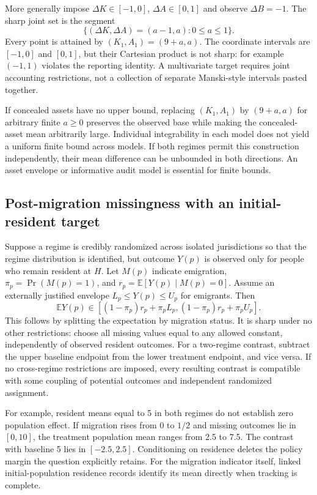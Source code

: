 \documentclass[11pt]{article}
\newcommand{\E}{\mathbb E}
\begin{document}
More generally impose $\Delta K\in[-1,0]$, $\Delta A\in[0,1]$ and observe
$\Delta B=-1$. The sharp joint set is the segment
\[
 \{(\Delta K,\Delta A)=(a-1,a):0\leq a\leq1\}.
\]
Every point is attained by $(K_1,A_1)=(9+a,a)$. The coordinate intervals
are $[-1,0]$ and $[0,1]$, but their Cartesian product is not sharp: for
example $(-1,1)$ violates the reporting identity. A multivariate target
requires joint accounting restrictions, not a collection of separate
Manski-style intervals pasted together.

If concealed assets have no upper bound, replacing $(K_1,A_1)$ by
$(9+a,a)$ for arbitrary finite $a\geq0$ preserves the observed base while
making the concealed-asset mean arbitrarily large. Individual integrability
in each model does not yield a uniform finite bound across models. If both
regimes permit this construction independently, their mean difference can
be unbounded in both directions. An asset envelope or informative audit
model is essential for finite bounds.

\subsection*{Post-migration missingness with an initial-resident target}
Suppose a regime is credibly randomized across isolated jurisdictions so
that the regime distribution is identified, but outcome $Y(p)$ is observed
only for people who remain resident at $H$. Let $M(p)$ indicate emigration,
$\pi_p=\Pr(M(p)=1)$, and
$r_p=\E[Y(p)\mid M(p)=0]$. Assume an externally justified envelope
$L_p\leq Y(p)\leq U_p$ for emigrants. Then
\[
 \E Y(p)\in[(1-\pi_p)r_p+\pi_pL_p,
             (1-\pi_p)r_p+\pi_pU_p].
\]
This follows by splitting the expectation by migration status. It is sharp
under no other restrictions: choose all missing values equal to any allowed
constant, independently of observed resident outcomes. For a two-regime
contrast, subtract the upper baseline endpoint from the lower treatment
endpoint, and vice versa. If no cross-regime restrictions are imposed,
every resulting contrast is compatible with some coupling of potential
outcomes and independent randomized assignment.

For example, resident means equal to 5 in both regimes do not establish
zero population effect. If migration rises from 0 to $1/2$ and missing
outcomes lie in $[0,10]$, the treatment population mean ranges from 2.5
to 7.5. The contrast with baseline 5 lies in $[-2.5,2.5]$. Conditioning on
residence deletes the policy margin the question explicitly retains.
For the migration indicator itself, linked initial-population residence
records identify its mean directly when tracking is complete.
\end{document}
